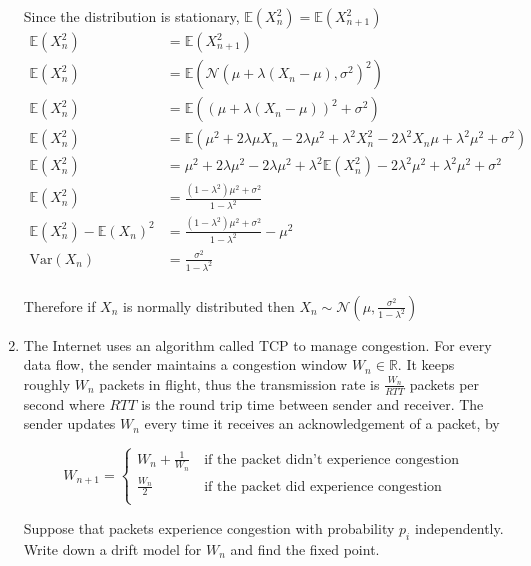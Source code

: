 \documentclass[10pt,\jkfside,a4paper]{article}
\begin{document}
\begin{enumerate}
Since the distribution is stationary, $\mathbb{E}(X_n^2) = \mathbb{E}
(X_{n+1}^2)$
\[
\begin{split}
\mathbb{E}(X_n^2)
&= \mathbb{E}(X_{n + 1}^2) \\
\mathbb{E}(X_n^2)
&= \mathbb{E}(\mathcal{N}(\mu + \lambda(X_n - \mu), \sigma^2)^2) \\
\mathbb{E}(X_n^2)
&= \mathbb{E}((\mu + \lambda(X_n - \mu))^2 + \sigma^2) \\
\mathbb{E}(X_n^2)
&= \mathbb{E}(\mu^2 + 2\lambda \mu X_n - 2\lambda \mu^2 + \lambda^2 X_n^2 -
2\lambda^2 X_n\mu + \lambda^2\mu^2 + \sigma^2) \\
\mathbb{E}(X_n^2)
&= \mu^2 + 2\lambda\mu^2  - 2\lambda \mu^2 + \lambda^2\mathbb{E}(X_n^2) -
2\lambda^2\mu^2 + \lambda^2\mu^2 + \sigma^2 \\
\mathbb{E}(X_n^2)
&= \frac{(1 - \lambda^2)\mu^2 + \sigma^2}{1 - \lambda^2} \\
\mathbb{E}(X_n^2) - \mathbb{E}(X_n)^2
&= \frac{(1 - \lambda^2)\mu^2 + \sigma^2}{1 - \lambda^2} -
\mu^2 \\
\text{Var}(X_n)
&= \frac{\sigma^2}{1 - \lambda^2} \\
\end{split}
\]

Therefore if $X_n$ is normally distributed then $X_n \sim \mathcal{N}\left
(\mu, \frac{\sigma^2}{1 - \lambda^2}
\right)$

\item The Internet uses an algorithm called TCP to manage congestion. For
every data flow, the sender maintains a congestion window $W_n \in
\mathbb{R}$. It keeps roughly $W_n$ packets in flight, thus the transmission
rate is $\frac{W_n}{RTT}$ packets per second where $RTT$ is the round trip
time between sender and receiver. The sender updates $W_n$ every time it
receives an acknowledgement of a packet, by

\[
W_{n + 1} =
\begin{cases}
W_n + \frac{1}{W_n} & \ \text{if the packet didn't experience congestion} \\
\frac{W_n}{2} & \ \text{if the packet did experience congestion} \\
\end{cases}
\]

Suppose that packets experience congestion with probability $p_i$
independently. Write down a drift model for $W_n$ and find the fixed point.


\end{enumerate}
\end{document}
